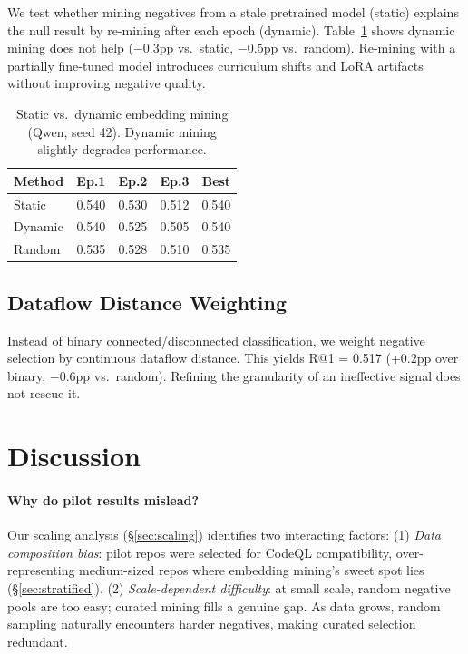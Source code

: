 \documentclass[11pt,a4paper]{article}
\begin{document}
We test whether mining negatives from a stale pretrained model (static) explains the null result by re-mining after each epoch (dynamic).
Table~\ref{tab:dynamic} shows dynamic mining does not help ($-0.3$pp vs.\ static, $-0.5$pp vs.\ random).
Re-mining with a partially fine-tuned model introduces curriculum shifts and LoRA artifacts without improving negative quality.

\begin{table}[t]
\centering
\small
\caption{Static vs.\ dynamic embedding mining (Qwen, seed 42). Dynamic mining slightly degrades performance.}
\label{tab:dynamic}
\begin{tabular}{lcccc}
\toprule
Method & Ep.1 & Ep.2 & Ep.3 & Best \\
\midrule
Static  & 0.540 & 0.530 & 0.512 & 0.540 \\
Dynamic & 0.540 & 0.525 & 0.505 & 0.540 \\
Random  & 0.535 & 0.528 & 0.510 & 0.535 \\
\bottomrule
\end{tabular}
\end{table}

\subsection{Dataflow Distance Weighting}

Instead of binary connected/disconnected classification, we weight negative selection by continuous dataflow distance.
This yields R@1 = 0.517 (+0.2pp over binary, $-0.6$pp vs.\ random).
Refining the granularity of an ineffective signal does not rescue it.

\section{Discussion}

\paragraph{Why do pilot results mislead?}
Our scaling analysis (\S\ref{sec:scaling}) identifies two interacting factors:
(1) \emph{Data composition bias}: pilot repos were selected for CodeQL compatibility, over-representing medium-sized repos where embedding mining's sweet spot lies (\S\ref{sec:stratified}).
(2) \emph{Scale-dependent difficulty}: at small scale, random negative pools are too easy; curated mining fills a genuine gap.
As data grows, random sampling naturally encounters harder negatives, making curated selection redundant.
\end{document}
